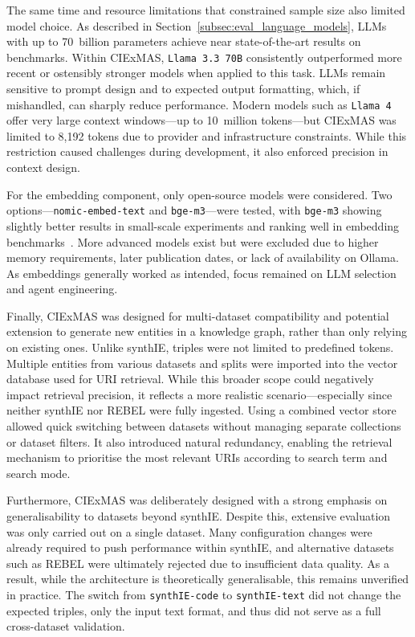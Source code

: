 \documentclass[a4paper,oneside,bibliography=totoc]{scrbook}
\begin{document}
The same time and resource limitations that constrained sample size also limited model choice. As described in Section~\ref{subsec:eval_language_models}, \acp{LLM} with up to 70~billion parameters achieve near state-of-the-art results on benchmarks. Within CIExMAS, \texttt{Llama~3.3~70B} consistently outperformed more recent or ostensibly stronger models when applied to this task. \acp{LLM} remain sensitive to prompt design and to expected output formatting, which, if mishandled, can sharply reduce performance. Modern models such as \texttt{Llama~4} offer very large context windows—up to 10~million tokens—but CIExMAS was limited to 8{,}192 tokens due to provider and infrastructure constraints. While this restriction caused challenges during development, it also enforced precision in context design.

For the embedding component, only open-source models were considered. Two options—\texttt{nomic-embed-text} and \texttt{bge-m3}—were tested, with \texttt{bge-m3} showing slightly better results in small-scale experiments and ranking well in embedding benchmarks~\cite{Muennighoff2023}. More advanced models exist but were excluded due to higher memory requirements, later publication dates, or lack of availability on Ollama. As embeddings generally worked as intended, focus remained on \ac{LLM} selection and agent engineering.

Finally, CIExMAS was designed for multi-dataset compatibility and potential extension to generate new entities in a knowledge graph, rather than only relying on existing ones. Unlike synthIE, triples were not limited to predefined tokens. Multiple entities from various datasets and splits were imported into the vector database used for URI retrieval. While this broader scope could negatively impact retrieval precision, it reflects a more realistic scenario—especially since neither synthIE nor REBEL were fully ingested. Using a combined vector store allowed quick switching between datasets without managing separate collections or dataset filters. It also introduced natural redundancy, enabling the retrieval mechanism to prioritise the most relevant URIs according to search term and search mode.

Furthermore, CIExMAS was deliberately designed with a strong emphasis on generalisability to datasets beyond synthIE. Despite this, extensive evaluation was only carried out on a single dataset. Many configuration changes were already required to push performance within synthIE, and alternative datasets such as REBEL were ultimately rejected due to insufficient data quality. As a result, while the architecture is theoretically generalisable, this remains unverified in practice. The switch from \texttt{synthIE-code} to \texttt{synthIE-text} did not change the expected triples, only the input text format, and thus did not serve as a full cross-dataset validation.
\end{document}
